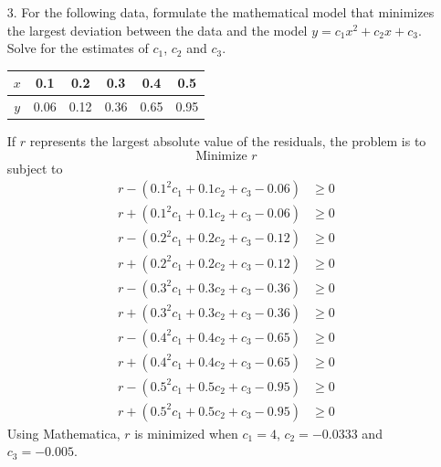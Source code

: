 \documentclass[10pt]{report}
\begin{document}
\begin{enumerate}
	\item [3.]
	For the following data, formulate the mathematical model that minimizes the largest deviation between the data and the model $y = c_1 x^2 + c_2 x + c_3$. Solve for the estimates of $c_1$, $c_2$ and $c_3$.
	\begin{table}[H]
		\centering
		\begin{tabular}{*{6}{c}} 
			\toprule
			$x$ & 0.1 & 0.2 & 0.3 & 0.4 & 0.5 \\ \midrule
			$y$ & 0.06 & 0.12 & 0.36 & 0.65 & 0.95 \\
			\bottomrule
		\end{tabular}
	\end{table}
	If $r$ represents the largest absolute value of the residuals, the problem is to
	\[
	\text{Minimize } r
	\]
	subject to
	\begin{align*}
	r - (0.1^2 c_1 + 0.1 c_2 + c_3 - 0.06) &\ge 0\\
	r + (0.1^2 c_1 + 0.1 c_2 + c_3 - 0.06) &\ge 0\\
	r - (0.2^2 c_1 + 0.2 c_2 + c_3 - 0.12) &\ge 0\\
	r + (0.2^2 c_1 + 0.2 c_2 + c_3 - 0.12) &\ge 0\\
	r - (0.3^2 c_1 + 0.3 c_2 + c_3 - 0.36) &\ge 0\\
	r + (0.3^2 c_1 + 0.3 c_2 + c_3 - 0.36) &\ge 0\\
	r - (0.4^2 c_1 + 0.4 c_2 + c_3 - 0.65) &\ge 0\\
	r + (0.4^2 c_1 + 0.4 c_2 + c_3 - 0.65) &\ge 0\\
	r - (0.5^2 c_1 + 0.5 c_2 + c_3 - 0.95) &\ge 0\\
	r + (0.5^2 c_1 + 0.5 c_2 + c_3 - 0.95) &\ge 0
	\end{align*}
	Using Mathematica, $r$ is minimized when $c_1=4$, $c_2=-0.0333$ and $c_3=-0.005$.
\end{enumerate}
\end{document}

